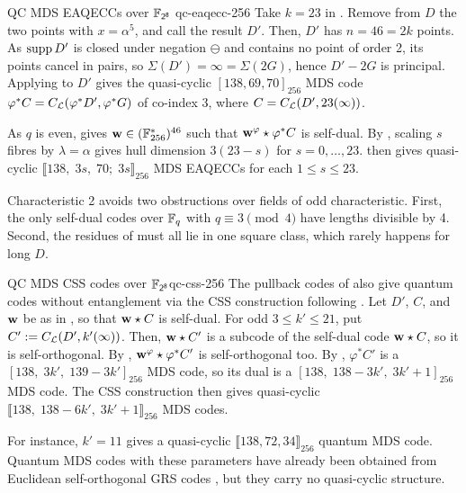 \documentclass[twocolumn, 11pt]{scrartcl}
\begin{document}
\begin{example}{QC MDS EAQECCs over $\mathsf{\mathbb{F}_{2^8}}$ \cite{code-f256}}{qc-eaqecc-256}
Take $k=23$ in . Remove from $D$ the two points with $x=\alpha^5$, and call the result $D'$. Then, $D'$ has $n=46=2k$ points. As $\operatorname{supp} D'$ is closed under negation $\ominus$ and contains no point of order 2, its points cancel in pairs, so $\Sigma(D')=\infty=\Sigma(2G)$, hence $D'-2G$ is principal. Applying  to $D'$ gives the quasi-cyclic $[138,69,70]_{256}$ MDS code $\varphi^*C=C_\mathcal{L}(\varphi^*D',\varphi^*G)$ of co-index 3, where $C=C_\mathcal{L}(D',23(\infty))$.
 
As $q$ is even,  gives $\mathbf{w}\in(\mathbb{F}_{256}^*)^{46}$ such that $\mathbf{w}^\varphi\star\varphi^*C$ is self-dual. By , scaling $s$ fibres by $\lambda=\alpha$ gives hull dimension $3(23-s)$ for $s=0,\hdots,23$.  then gives quasi-cyclic $\llbracket138,\;3s,\;70;\;3s\rrbracket_{256}$ MDS EAQECCs for each $1\leq s\leq 23$.

Characteristic 2 avoids two obstructions over fields of odd characteristic. First, the only self-dual codes over $\mathbb{F}_q$ with $q\equiv3\pmod4$ have lengths divisible by 4. Second, the residues of  must all lie in one square class, which rarely happens for long $D$.
\end{example}

\begin{example}{QC MDS CSS codes over $\mathsf{\mathbb{F}_{2^8}}$}{qc-css-256} 
The pullback codes of  also give quantum codes without entanglement via the CSS construction following . Let $D'$, $C$, and $\mathbf{w}$ be as in , so that $\mathbf{w}\star C$ is self-dual. For odd $3\leq k'\leq21$, put $C':=C_\mathcal{L}(D',k'(\infty))$. Then, $\mathbf{w}\star C'$ is a subcode of the self-dual code $\mathbf{w}\star C$, so it is self-orthogonal. By , $\mathbf{w}^\varphi\star\varphi^*C'$ is self-orthogonal too. By , $\varphi^*C'$ is a $[138,\;3k',\;139-3k']_{256}$ MDS code, so its dual is a $[138,\;138-3k',\;3k'+1]_{256}$ MDS code. The CSS construction then gives quasi-cyclic $\llbracket138,\;138-6k',\;3k'+1\rrbracket_{256}$ MDS codes.

For instance, $k'=11$ gives a quasi-cyclic $\llbracket138,72,34\rrbracket_{256}$ quantum MDS code. Quantum MDS codes with these parameters have already been obtained from Euclidean self-orthogonal GRS codes \cite[Thm.~5.3]{jin2012euclidean}, but they carry no quasi-cyclic structure.
\end{example}
\end{document}
